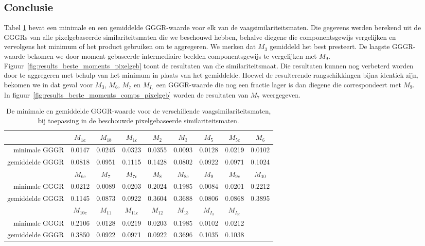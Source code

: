 \subsection{Conclusie}

Tabel \ref{tab:stat_gegevens_pixelgeb_maten} bevat een minimale en een gemiddelde GGGR-waarde voor elk van de vaagsimilariteitsmaten.
Die gegevens werden berekend uit de GGGRs van alle pixelgebaseerde similariteitsmaten
die we beschouwd hebben, behalve diegene die componentsgewijs vergelijken en vervolgens het 
minimum of het product gebruiken om te aggregeren. We merken dat $M_3$ gemiddeld het best 
presteert. De laagste GGGR-waarde bekomen we door moment-gebaseerde intermediaire beelden 
componentsgewijs te vergelijken met $M_9$. Figuur~\ref{fig:results_beste_moments_pixelgeb} 
toont de resultaten van die similariteitsmaat. Die resultaten kunnen nog verbeterd worden 
door te aggregeren met behulp van het minimum in plaats van het gemiddelde. Hoewel de 
resulterende rangschikkingen bijna identiek zijn, bekomen we in dat geval voor $M_3$, $M_6$, 
$M_7$ en $M_{I_3}$ een GGGR-waarde die nog een fractie lager is dan diegene die correspondeert
met $M_9$. In figuur~\ref{fig:results_beste_moments_comps_pixelgeb} worden de resultaten
van $M_7$ weergegeven.

\begin{table}[!b]
\vspace{10pt}
\centering
\small
\begin{tabular}{r|cccccccc}
& $M_{1a}$ & $M_{1b}$ & $M_{1c}$ & $M_{2}$ & $M_{3}$ & $M_{5}$ & $M_{5c}$ & $M_{6}$ \\
\hline
minimale GGGR & 0.0147 & 0.0245 & 0.0323 & 0.0355 & 0.0093 & 0.0128 & 0.0219 & 0.0102 \\
gemiddelde GGGR & 0.0818 & 0.0951 & 0.1115 & 0.1428 & 0.0802 & 0.0922 & 0.0971 & 0.1024\vspace{8pt}\\
& $M_{6c}$ & $M_{7}$ & $M_{7c}$ & $M_{8}$ & $M_{8c}$ & $M_{9}$ & $M_{9c}$ & $M_{10}$ \\
\hline
minimale GGGR & 0.0212 & 0.0089 & 0.0203 & 0.2024 & 0.1985 & 0.0084 & 0.0201 & 0.2212 \\
gemiddelde GGGR & 0.1145 & 0.0873 & 0.0922 & 0.3604 & 0.3688 & 0.0806 & 0.0868 & 0.3895\vspace{8pt}\\
& $M_{10c}$ & $M_{11}$ & $M_{11c}$ & $M_{12}$ & $M_{13}$ & $M_{I_3}$ & $M_{I_{3c}}$ \\
\hline
minimale GGGR & 0.2106 & 0.0128 & 0.0219 & 0.0203 & 0.1985 & 0.0102 & 0.0212 \\
gemiddelde GGGR & 0.3850 & 0.0922 & 0.0971 & 0.0922 & 0.3696 & 0.1035 & 0.1038
\end{tabular}
\vspace{10pt}
\caption{\label{tab:stat_gegevens_pixelgeb_maten}De minimale en gemiddelde GGGR-waarde voor 
de verschillende vaagsimilariteitsmaten, bij toepassing in de beschouwde pixelgebaseerde 
similariteitsmaten.}
\end{table}